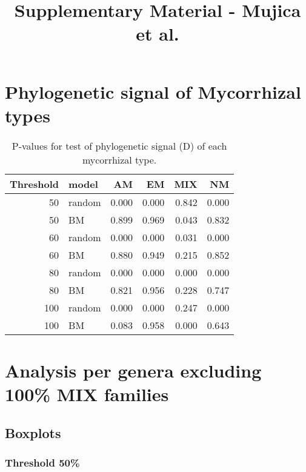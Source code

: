 \documentclass[]{article}
\title{Supplementary Material - Mujica et al.}
\author{}
\date{}
\begin{document}
\maketitle

\hypertarget{phylogenetic-signal-of-mycorrhizal-types}{%
\section{Phylogenetic signal of Mycorrhizal
types}\label{phylogenetic-signal-of-mycorrhizal-types}}

\begin{table}[H]

\caption{\label{tab:unnamed-chunk-2}P-values for test of phylogenetic signal (D) of each mycorrhizal type.}
\centering
\begin{tabular}{r|l|r|r|r|r}
\hline
Threshold & model & AM & EM & MIX & NM\\
\hline
50 & random & 0.000 & 0.000 & 0.842 & 0.000\\
\hline
50 & BM & 0.899 & 0.969 & 0.043 & 0.832\\
\hline
60 & random & 0.000 & 0.000 & 0.031 & 0.000\\
\hline
60 & BM & 0.880 & 0.949 & 0.215 & 0.852\\
\hline
80 & random & 0.000 & 0.000 & 0.000 & 0.000\\
\hline
80 & BM & 0.821 & 0.956 & 0.228 & 0.747\\
\hline
100 & random & 0.000 & 0.000 & 0.247 & 0.000\\
\hline
100 & BM & 0.083 & 0.958 & 0.000 & 0.643\\
\hline
\end{tabular}
\end{table}

\hypertarget{analysis-per-genera-excluding-100-mix-families}{%
\section{Analysis per genera excluding 100\% MIX
families}\label{analysis-per-genera-excluding-100-mix-families}}

\hypertarget{boxplots}{%
\subsection{Boxplots}\label{boxplots}}

\hypertarget{threshold-50}{%
\subsubsection{Threshold 50\%}\label{threshold-50}}
\end{document}
